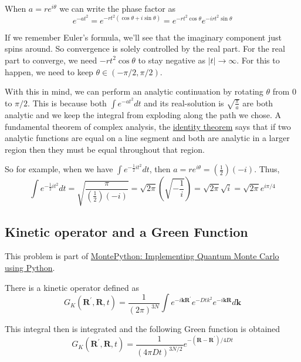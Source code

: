 When $a = re^{i\theta}$ we can write the phase factor as
$$
e^{-at^2} = e^{-rt^2 \left(\cos\theta + i\sin\theta\right)}
= e^{-rt^2 \cos\theta}
    e^{-irt^2 \sin\theta}
$$

If we remember Euler's formula, we'll see that the imaginary component just spins around.
So convergence is solely controlled by the real part.
For the real part to converge, we need $-rt^2 \cos\theta$ to stay negative as $|t| \rightarrow \infty$.
For this to happen, we need to keep $\theta \in \left(-\pi/2, \pi/2\right)$.

With this in mind, we can perform an analytic continuation by rotating $\theta$ from $0$ to $\pi/2$.
This is because both $\int e^{-at^2} dt$ and its real-solution is $\sqrt{\frac{\pi}{a}}$ are both analytic
and we keep the integral from exploding along the path we chose.
A fundamental theorem of complex analysis, the
\href{https://en.wikipedia.org/wiki/Identity_theorem}{identity theorem} says that
if two analytic functions are equal on a line segment and both are analytic in a larger region
then they must be equal throughout that region.

So for example, when we have $\int e^{-\frac{1}{2} it^2} dt$, then
$a = r e^{i\theta} = \left(\frac{1}{2}\right)\left(-i\right)$.
Thus,
$$
\int e^{-\frac{1}{2} it^2} dt = \sqrt{ \frac{\pi}{\left(\frac{1}{2}\right)\left(-i\right)} }
= \sqrt{2\pi} \left(\sqrt{-\frac{1}{i} }\right)
= \sqrt{2\pi} \sqrt{i}
= \sqrt{2\pi} e^{i\pi/4}
$$



\subsection{Kinetic operator and a Green Function} \label{integral:kinetic-operator}

This problem is part of
\href{https://arxiv.org/abs/physics/0609191}{MontePython: Implementing Quantum Monte Carlo using Python}.

There is a kinetic operator defined as
$$
G_K \left(\mathbf{R}^\prime, \mathbf{R}, t\right) =
\frac{1}{\left(2\pi\right)^{3N}} \int e^{-i\mathbf{k}\mathbf{R}^\prime} e^{-Dtk^2} e^{-i\mathbf{k}\mathbf{R}} d\mathbf{k}
$$

This integral then is integrated and the following Green function is obtained
$$
G_K \left(\mathbf{R}^\prime, \mathbf{R}, t\right) =
\frac{1}{\left(4\pi Dt\right)^{3N/2}} e^{-\left(\mathbf{R}-\mathbf{R}^\prime\right) / 4Dt}
$$

